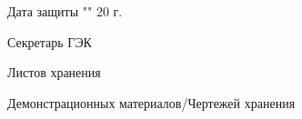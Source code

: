 \noindent Дата защиты "\underline{\hspace{0.5cm}}" \underline{\hspace{4cm}} 20 \underline{\hspace{1cm}}г. \hspace{0.3cm}

\vspace{1cm}

\noindent Секретарь ГЭК \underline{\hspace{5.2cm}}

\vspace{1cm}

\noindent Листов хранения \underline{\hspace{5cm}}

\vspace{1cm}

\noindent Демонстрационных материалов/Чертежей хранения \underline{\hspace{5cm}}
